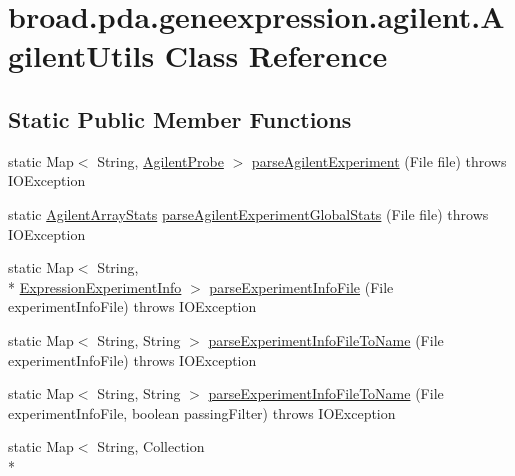 \hypertarget{classbroad_1_1pda_1_1geneexpression_1_1agilent_1_1_agilent_utils}{\section{broad.\+pda.\+geneexpression.\+agilent.\+Agilent\+Utils Class Reference}
\label{classbroad_1_1pda_1_1geneexpression_1_1agilent_1_1_agilent_utils}
}
\subsection*{Static Public Member Functions}
\begin{DoxyCompactItemize}
\item 
static Map$<$ String, \hyperlink{classbroad_1_1pda_1_1geneexpression_1_1agilent_1_1_agilent_probe}{Agilent\+Probe} $>$ \hyperlink{classbroad_1_1pda_1_1geneexpression_1_1agilent_1_1_agilent_utils_a0e6e815c1d5598390d2948ac0b1559c3}{parse\+Agilent\+Experiment} (File file)  throws I\+O\+Exception
\item 
static \hyperlink{classbroad_1_1pda_1_1geneexpression_1_1agilent_1_1_agilent_array_stats}{Agilent\+Array\+Stats} \hyperlink{classbroad_1_1pda_1_1geneexpression_1_1agilent_1_1_agilent_utils_aec336dfe5711938e9b0a010e239e8543}{parse\+Agilent\+Experiment\+Global\+Stats} (File file)  throws I\+O\+Exception 
\item 
static Map$<$ String, \\*
\hyperlink{classbroad_1_1pda_1_1geneexpression_1_1_expression_experiment_info}{Expression\+Experiment\+Info} $>$ \hyperlink{classbroad_1_1pda_1_1geneexpression_1_1agilent_1_1_agilent_utils_ab5338a4f9bb78501f370903abafc61a5}{parse\+Experiment\+Info\+File} (File experiment\+Info\+File)  throws I\+O\+Exception 
\item 
static Map$<$ String, String $>$ \hyperlink{classbroad_1_1pda_1_1geneexpression_1_1agilent_1_1_agilent_utils_aaec93dcde80a4ee431b2b5abf1c81085}{parse\+Experiment\+Info\+File\+To\+Name} (File experiment\+Info\+File)  throws I\+O\+Exception 
\item 
static Map$<$ String, String $>$ \hyperlink{classbroad_1_1pda_1_1geneexpression_1_1agilent_1_1_agilent_utils_a3e300f596a020c256f6f430137fb5b16}{parse\+Experiment\+Info\+File\+To\+Name} (File experiment\+Info\+File, boolean passing\+Filter)  throws I\+O\+Exception 
\item 
static Map$<$ String, Collection\\*

\end{DoxyCompactItemize}
